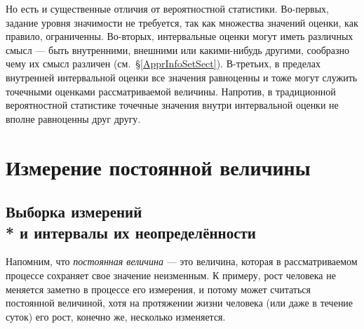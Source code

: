 \documentclass[a5paper,openany]{book}
\begin{document}
Но есть и существенные отличия от вероятностной статистики. Во-первых, задание уровня 
значимости не требуется, так как множества значений оценки, как правило, ограниченны. 
Во-вторых, интервальные оценки могут иметь различных смысл --- быть внутренними, 
внешними или какими-нибудь другими, сообразно чему их смысл различен 
(см.~\S\ref{ApprInfoSetSect}). В-третьих, в пределах внутренней интервальной оценки 
все значения равноценны и тоже могут служить точечными оценками рассматриваемой величины. 
Напротив, в традиционной вероятностной статистике точечные значения внутри интервальной 
оценки не вполне равноценны друг другу. 
  
      
  
\chapter{Измерение постоянной величины} 
\label{MeasrConstChap}
  
  
\section[Выборка измерений и интервалы их неопределённости]%
        {Выборка измерений \\*  и интервалы их неопределённости} 
\label{MeasSetInte}   
  
Напомним, что \emph{постоянная величина} --- это величина, которая в рассматриваемом 
процессе сохраняет свое значение неизменным. К примеру, рост человека не меняется 
заметно в процессе его измерения, и потому может считаться постоянной величиной, 
хотя на протяжении жизни человека (или даже в течение суток) его рост, конечно же, 
несколько изменяется.                              
  
\end{document}
